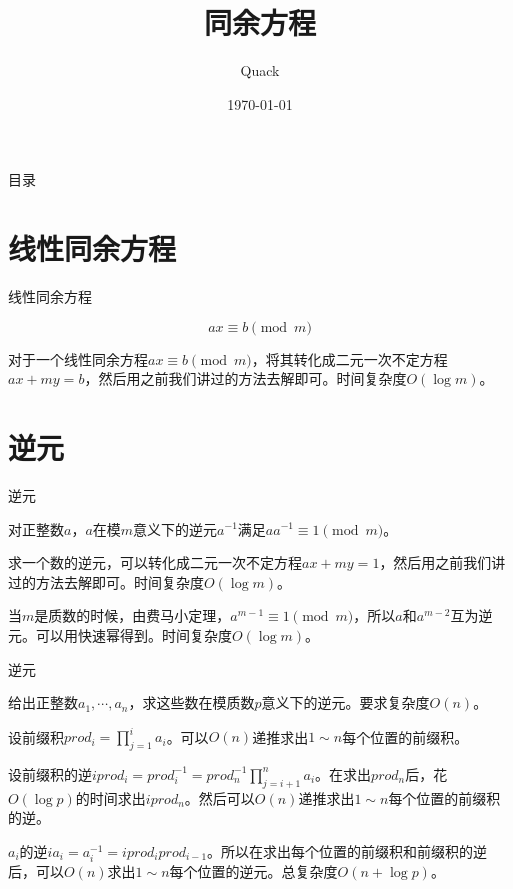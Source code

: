 \documentclass{ctexbeamer}        %
\begin{document}
%
\title{同余方程}
\author{Quack}
\date{\today}
\frame{\titlepage}

\begin{frame}{目录}         %
  \tableofcontents[hideallsubsections]
\end{frame}

\section{线性同余方程}

\begin{frame}{线性同余方程}

\begin{definition}[线性同余方程]
    $$ax \equiv b \pmod m$$
\end{definition}

对于一个线性同余方程$ax \equiv b \pmod m$，将其转化成二元一次不定方程$ax+my=b$，然后用之前我们讲过的方法去解即可。时间复杂度$O(\log m)$。

\end{frame}


\section{逆元}

\begin{frame}{逆元}

\begin{definition}[逆元]
    对正整数$a$，$a$在模$m$意义下的逆元$a^{-1}$满足$aa^{-1} \equiv 1 \pmod m$。
\end{definition}

求一个数的逆元，可以转化成二元一次不定方程$ax+my=1$，然后用之前我们讲过的方法去解即可。时间复杂度$O(\log m)$。

当$m$是质数的时候，由费马小定理，$a^{m-1}\equiv 1 \pmod m$，所以$a$和$a^{m-2}$互为逆元。可以用快速幂得到。时间复杂度$O(\log m)$。

\end{frame}

\begin{frame}{逆元}

\begin{example}[多个数的逆元]
    给出正整数$a_1,\cdots,a_n$，求这些数在模质数$p$意义下的逆元。要求复杂度$O(n)$。
\end{example}
\pause
设前缀积$prod_i=\prod_{j=1}^i a_i$。可以$O(n)$递推求出$1\sim n$每个位置的前缀积。

设前缀积的逆$iprod_i=prod_i^{-1}=prod_n^{-1}\prod_{j=i+1}^n a_i$。在求出$prod_n$后，花$O(\log p)$的时间求出$iprod_n$。然后可以$O(n)$递推求出$1\sim n$每个位置的前缀积的逆。

$a_i$的逆$ia_i=a_i^{-1}=iprod_i prod_{i-1}$。所以在求出每个位置的前缀积和前缀积的逆后，可以$O(n)$求出$1\sim n$每个位置的逆元。总复杂度$O(n+\log p)$。

\end{frame}
\end{document}
